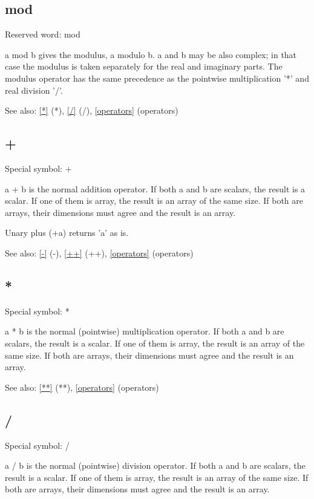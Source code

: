 \documentclass[a4paper]{article}
\begin{document}
\subsection{mod\label{mod}}

Reserved word: mod

a mod b gives the modulus, a modulo b. a and b may be also complex; in
that case the modulus is taken separately for the real and imaginary
parts. The modulus operator has the same precedence as the pointwise
multiplication '*' and real division '/'.

See also: \ref{*} {(*)}, \ref{/} {(/)}, \ref{operators} {(operators)}




\subsection{+\label{+}}

Special symbol: +

a + b is the normal addition operator. If both a and b are scalars,
the result is a scalar. If one of them is array, the result is an
array of the same size. If both are arrays, their dimensions must
agree and the result is an array.

Unary plus (+a) returns 'a' as is.

See also: \ref{-} {(-)}, \ref{++} {(++)}, \ref{operators} {(operators)}




\subsection{*\label{*}}

Special symbol: *

a * b is the normal (pointwise) multiplication operator. If both a and
b are scalars, the result is a scalar. If one of them is array, the
result is an array of the same size. If both are arrays, their
dimensions must agree and the result is an array.

See also: \ref{**} {(**)}, \ref{operators} {(operators)}




\subsection{/\label{/}}

Special symbol: /

a / b is the normal (pointwise) division operator. If both a and b are
scalars, the result is a scalar. If one of them is array, the result
is an array of the same size. If both are arrays, their dimensions
must agree and the result is an array.
\end{document}
